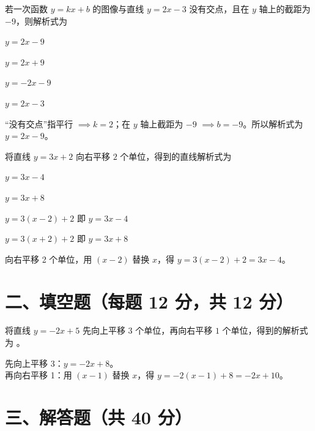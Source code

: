 \documentclass{exam-zh}
\begin{document}
\begin{question}[points=12]
  若一次函数 $y = kx + b$ 的图像与直线 $y = 2x - 3$ 没有交点，且在 $y$ 轴上的截距为 $-9$，则解析式为
  \begin{choices}
    \item $y = 2x - 9$
    \item $y = 2x + 9$
    \item $y = -2x - 9$
    \item $y = 2x - 3$
  \end{choices}
  \paren[A]
  \begin{solutionblock}
    “没有交点”指平行 $\implies k = 2$；在 $y$ 轴上截距为 $-9$ $\implies b = -9$。所以解析式为 $y = 2x - 9$。
  \end{solutionblock}
\end{question}



\begin{question}[points=12]
  将直线 $y = 3x + 2$ 向右平移 $2$ 个单位，得到的直线解析式为
  \begin{choices}
    \item $y = 3x - 4$
    \item $y = 3x + 8$
    \item $y = 3(x - 2) + 2$ 即 $y = 3x - 4$
    \item $y = 3(x + 2) + 2$ 即 $y = 3x + 8$
  \end{choices}
  \paren[C]
  \begin{solutionblock}
    向右平移 2 个单位，用 $(x-2)$ 替换 $x$，得 $y = 3(x-2) + 2 = 3x - 4$。
  \end{solutionblock}
\end{question}


\section*{二、填空题（每题 12 分，共 12 分）}


\begin{question}[points=12]
  将直线 $y = -2x + 5$ 先向上平移 $3$ 个单位，再向右平移 $1$ 个单位，得到的解析式为 \fillin。
  \paren[$y = -2x + 10$]
  \begin{solutionblock}
    先向上平移 3：$y = -2x + 8$。\\ 再向右平移 1：用 $(x-1)$ 替换 $x$，得 $y = -2(x-1) + 8 = -2x + 10$。
  \end{solutionblock}
\end{question}


\section*{三、解答题（共 40 分）}
\end{document}
